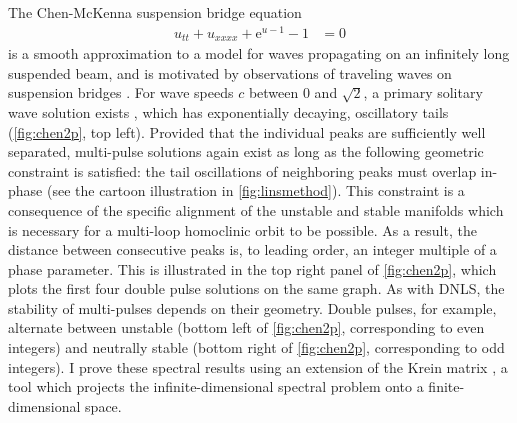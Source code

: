 \documentclass[12pt,reqno,oneside,hidelinks]{article}
\begin{document}
The Chen-McKenna suspension bridge equation 
\begin{align*}
    u_{tt} + u_{xxxx} + \mathrm{e}^{u-1} - 1 &= 0 
\end{align*}
is a smooth approximation to a model for waves propagating on an infinitely long suspended beam, and is motivated by observations of traveling waves on suspension bridges \cite{McKenna1990,Chen1997}. For wave speeds $c$ between 0 and $\sqrt{2}$, a primary solitary wave solution exists \cite{Berg2018}, which has exponentially decaying, oscillatory tails (\cref{fig:chen2p}, top left). Provided that the individual peaks are sufficiently well separated, multi-pulse solutions again exist as long as the following geometric constraint is satisfied: the tail oscillations of neighboring peaks must overlap in-phase (see the cartoon illustration in \cref{fig:linsmethod}). This constraint is a consequence of the specific alignment of the unstable and stable manifolds which is necessary for a multi-loop homoclinic orbit to be possible. As a result, the distance between consecutive peaks is, to leading order, an integer multiple of a phase parameter. This is illustrated in the top right panel of \cref{fig:chen2p}, which plots the first four double pulse solutions on the same graph. As with DNLS, the stability of multi-pulses depends on their geometry. Double pulses, for example, alternate between unstable (bottom left of \cref{fig:chen2p}, corresponding to even integers) and neutrally stable (bottom right of \cref{fig:chen2p}, corresponding to odd integers). I prove these spectral results using an extension of the Krein matrix \cite{Kapitula2020}, a tool which projects the infinite-dimensional spectral problem onto a finite-dimensional space. 
\end{document}
